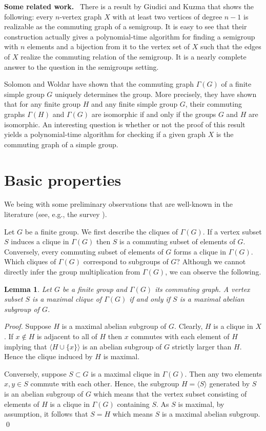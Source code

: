 \documentclass{elsarticle}
\newtheorem{lemma}[theorem]{Lemma}
\renewcommand{\angle}[1]{\langle#1\rangle} %
\begin{document}
\noindent\textbf{Some related work.}~ There is a result by Giudici and
Kuzma \cite{GK16} that shows the following: every $n$-vertex graph $X$
with at least two vertices of degree $n-1$ is realizable as the
commuting graph of a semigroup. It is easy to see that their
construction actually gives a polynomial-time algorithm for finding a
semigroup with $n$ elements and a bijection from it to the vertex set
of $X$ such that the edges of $X$ realize the commuting relation of
the semigroup. It is a nearly complete answer to the question in the
semigroups setting.

 Solomon and Woldar \cite{SW13} have shown that the commuting graph
 $\Gamma(G)$ of a finite simple group $G$ uniquely determines
 the group. More precisely, they have shown that for any finite group
 $H$ and any finite simple group $G$, their commuting graphs
 $\Gamma(H)$ and $\Gamma(G)$ are isomorphic if and only if the groups
 $G$ and $H$ are isomorphic. An interesting question is whether or not
 the proof of this result \cite{SW13} yields a polynomial-time
 algorithm for checking if a given graph $X$ is the commuting graph of
 a simple group.

\section{Basic properties}\label{basic-sec}

We being with some preliminary observations that are well-known in the
literature (see, e.g., the survey \cite{GGsurvey}).

Let $G$ be a finite group. We first describe the cliques of
$\Gamma(G)$. If a vertex subset $S$ induces a clique in $\Gamma(G)$
then $S$ is a commuting subset of elements of $G$. Conversely, every
commuting subset of elements of $G$ forms a clique in
$\Gamma(G)$. Which cliques of $\Gamma(G)$ correspond to subgroups of
$G$? Although we cannot directly infer the group multiplication from
$\Gamma(G)$, we can observe the following.

\begin{lemma}\label{maxclique-lem}
  Let $G$ be a finite group and $\Gamma(G)$ its commuting graph. A
  vertex subset $S$ is a \emph{maximal} clique of $\Gamma(G)$ if and only if $S$
  is a maximal abelian subgroup of $G$.
\end{lemma}

\begin{proof}
  Suppose $H$ is a maximal abelian subgroup of $G$. Clearly, $H$ is a
  clique in $X$. If $x\notin H$ is adjacent to all of $H$ then $x$
  commutes with each element of $H$ implying that $\angle{H\cup\{x\}}$
  is an abelian subgroup of $G$ strictly larger than $H$. Hence the
  clique induced by $H$ is maximal.

  Conversely, suppose $S\subset G$ is a maximal clique in $\Gamma(G)$.
  Then any two elements $x,y\in S$ commute with each other. Hence, the
  subgroup $H=\angle{S}$ generated by $S$ is an abelian subgroup of
  $G$ which means that the vertex subset consisting of elements of $H$
  is a clique in $\Gamma(G)$ containing $S$. As $S$ is maximal, by
  assumption, it follows that $S=H$ which means $S$ is a maximal
  abelian subgroup. \qed
\end{proof}
\end{document}
